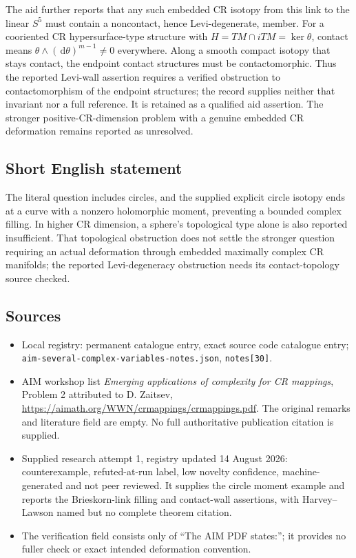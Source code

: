 \documentclass[11pt]{article}
\newcommand{\dd}{\,\mathrm{d}}
\begin{document}
The aid further reports that any such embedded CR isotopy from this link to the linear $S^5$ must contain a noncontact, hence Levi-degenerate, member. For a cooriented CR hypersurface-type structure with $H=TM\cap iTM=\ker\theta$, contact means $\theta\wedge(\dd\theta)^{m-1}\ne0$ everywhere. Along a smooth compact isotopy that stays contact, the endpoint contact structures must be contactomorphic. Thus the reported Levi-wall assertion requires a verified obstruction to contactomorphism of the endpoint structures; the record supplies neither that invariant nor a full reference. It is retained as a qualified aid assertion. The stronger positive-CR-dimension problem with a genuine embedded CR deformation remains reported as unresolved.
\subsection{Short English statement}
The literal question includes circles, and the supplied explicit circle isotopy ends at a curve with a nonzero holomorphic moment, preventing a bounded complex filling. In higher CR dimension, a sphere's topological type alone is also reported insufficient. That topological obstruction does not settle the stronger question requiring an actual deformation through embedded maximally complex CR manifolds; the reported Levi-degeneracy obstruction needs its contact-topology source checked.
\subsection{Sources}
\begin{itemize}
\item Local registry: permanent catalogue entry, exact source code catalogue entry; \texttt{aim-several-complex-variables-notes.json}, \texttt{notes[30]}.
\item AIM workshop list \emph{Emerging applications of complexity for CR mappings}, Problem 2 attributed to D. Zaitsev, \url{https://aimath.org/WWN/crmappings/crmappings.pdf}. The original remarks and literature field are empty. No full authoritative publication citation is supplied.
\item Supplied research attempt 1, registry updated 14 August 2026: counterexample, refuted-at-run label, low novelty confidence, machine-generated and not peer reviewed. It supplies the circle moment example and reports the Brieskorn-link filling and contact-wall assertions, with Harvey--Lawson named but no complete theorem citation.
\item The verification field consists only of ``The AIM PDF states:''; it provides no fuller check or exact intended deformation convention.
\end{itemize}
\end{document}
